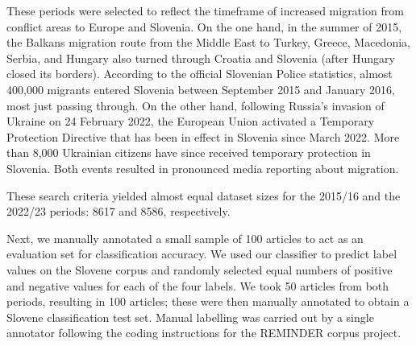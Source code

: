 \documentclass[10pt, a4paper]{article}
\begin{document}
\begin{table}[!ht]
  \begin{center}
    \caption{Search prefixes used for Slovene corpus construction.}
    \label{tab:search_prefixes}
 \end{center}
\end{table}
These periods were selected to reflect the timeframe of increased migration from conflict areas to Europe and Slovenia. 
On the one hand, in the summer of 2015, the Balkans migration route from the Middle East to Turkey, Greece, Macedonia, Serbia, and Hungary also turned through Croatia and Slovenia (after Hungary closed its borders). 
According to the official Slovenian Police statistics, almost 400,000 migrants entered Slovenia between September 2015 and January 2016, most just passing through. On the other hand, following Russia's invasion of Ukraine on 24 February 2022, the European Union activated a Temporary Protection Directive that has been in effect in Slovenia since March 2022. More than 8,000 Ukrainian citizens have since received temporary protection in Slovenia. Both events resulted in pronounced media reporting about migration. 

These search criteria yielded almost equal dataset sizes for the 2015/16 and the 2022/23 periods: 8617 and 8586, respectively.

Next, we manually annotated a small sample of 100 articles to act as an evaluation set for classification accuracy.
We used our classifier to predict label values on the Slovene corpus and randomly selected equal numbers of positive and negative values for each of the four labels.
We took 50 articles from both periods, resulting in 100 articles; these were then manually annotated to obtain a Slovene classification test set. Manual labelling was carried out by a single annotator following the coding instructions for the REMINDER corpus project.
\end{document}
